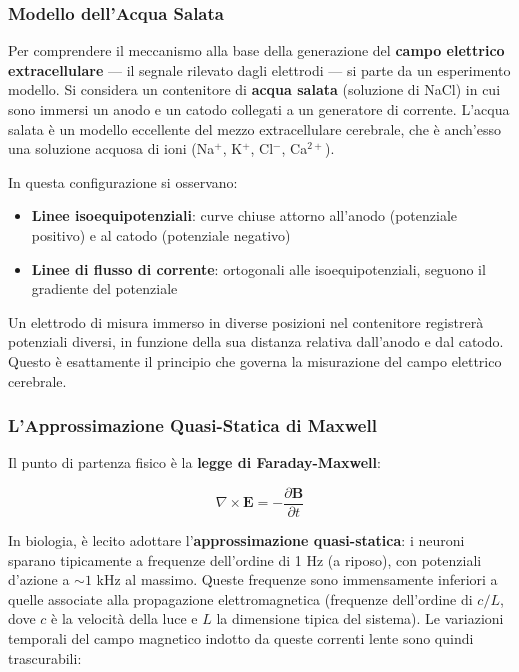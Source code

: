 \subsubsection{Modello dell'Acqua Salata}

Per comprendere il meccanismo alla base della generazione del \textbf{campo elettrico extracellulare} — il segnale rilevato dagli elettrodi — si parte da un esperimento modello. Si considera un contenitore di \textbf{acqua salata} (soluzione di NaCl) in cui sono immersi un anodo e un catodo collegati a un generatore di corrente. L'acqua salata è un modello eccellente del mezzo extracellulare cerebrale, che è anch'esso una soluzione acquosa di ioni (Na$^+$, K$^+$, Cl$^-$, Ca$^{2+}$).

In questa configurazione si osservano:
\begin{itemize}
    \item \textbf{Linee isoequipotenziali}: curve chiuse attorno all'anodo (potenziale positivo) e al catodo (potenziale negativo)
    \item \textbf{Linee di flusso di corrente}: ortogonali alle isoequipotenziali, seguono il gradiente del potenziale
\end{itemize}

Un elettrodo di misura immerso in diverse posizioni nel contenitore registrerà potenziali diversi, in funzione della sua distanza relativa dall'anodo e dal catodo. Questo è esattamente il principio che governa la misurazione del campo elettrico cerebrale.

\subsubsection{L'Approssimazione Quasi-Statica di Maxwell}

Il punto di partenza fisico è la \textbf{legge di Faraday-Maxwell}:

$$ \nabla \times \mathbf{E} = -\frac{\partial \mathbf{B}}{\partial t} $$

In biologia, è lecito adottare l'\textbf{approssimazione quasi-statica}: i neuroni sparano tipicamente a frequenze dell'ordine di 1 Hz (a riposo), con potenziali d'azione a $\sim 1$ kHz al massimo. Queste frequenze sono immensamente inferiori a quelle associate alla propagazione elettromagnetica (frequenze dell'ordine di $c/L$, dove $c$ è la velocità della luce e $L$ la dimensione tipica del sistema). Le variazioni temporali del campo magnetico indotto da queste correnti lente sono quindi trascurabili:

